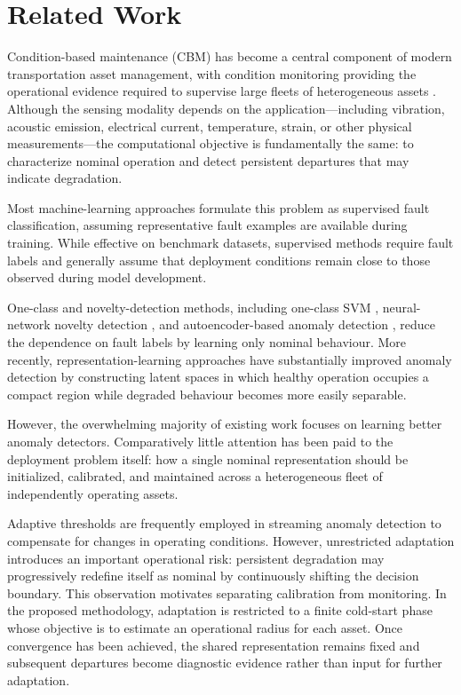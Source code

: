 \documentclass[11pt,a4paper]{article}
\begin{document}
\section{Related Work}
\label{sec:related}

Condition-based maintenance (CBM) has become a central component of modern transportation asset
management, with condition monitoring providing the operational evidence required to supervise
large fleets of heterogeneous assets
\cite{jardine2006,chandola2009,zhao2019}. Although the sensing modality depends on the
application---including vibration, acoustic emission, electrical current, temperature, strain,
or other physical measurements---the computational objective is fundamentally the same: to
characterize nominal operation and detect persistent departures that may indicate degradation.

Most machine-learning approaches formulate this problem as supervised fault classification,
assuming representative fault examples are available during training. While effective on
benchmark datasets, supervised methods require fault labels and generally assume that deployment
conditions remain close to those observed during model development.

One-class and novelty-detection methods, including one-class SVM
\cite{scholkopf1999}, neural-network novelty detection \cite{bishop1994}, and
autoencoder-based anomaly detection \cite{hinton2006,sakurada2014}, reduce the dependence on
fault labels by learning only nominal behaviour. More recently, representation-learning
approaches have substantially improved anomaly detection by constructing latent spaces in which
healthy operation occupies a compact region while degraded behaviour becomes more easily
separable.

However, the overwhelming majority of existing work focuses on learning better anomaly
detectors. Comparatively little attention has been paid to the deployment problem itself:
how a single nominal representation should be initialized, calibrated, and maintained across a
heterogeneous fleet of independently operating assets.

Adaptive thresholds are frequently employed in streaming anomaly detection to compensate for
changes in operating conditions. However, unrestricted adaptation introduces an important
operational risk: persistent degradation may progressively redefine itself as nominal by
continuously shifting the decision boundary. This observation motivates separating calibration
from monitoring. In the proposed methodology, adaptation is restricted to a finite cold-start
phase whose objective is to estimate an operational radius for each asset. Once convergence has
been achieved, the shared representation remains fixed and subsequent departures become
diagnostic evidence rather than input for further adaptation.
\end{document}
